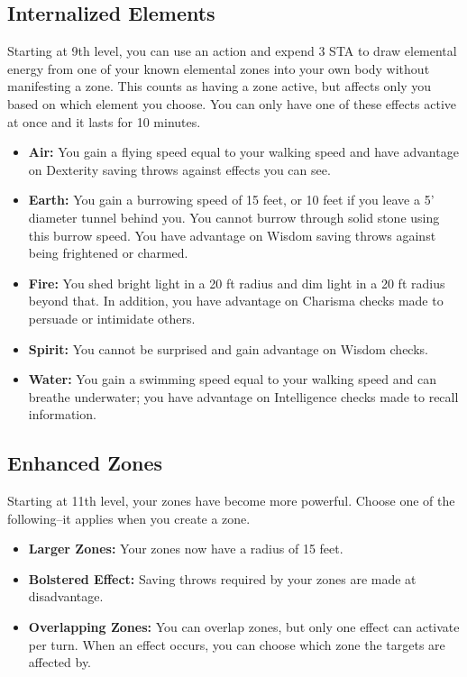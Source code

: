 \subsection{Internalized Elements}
Starting at 9th level, you can use an action and expend 3 STA to draw elemental energy from one of your known elemental zones into your own body without manifesting a zone. This counts as having a zone active, but affects only you based on which element you choose. You can only have one of these effects active at once and it lasts for 10 minutes.
\begin{itemize}
	\item \textbf{Air:} You gain a flying speed equal to your walking speed and have advantage on Dexterity saving throws against effects you can see.
	\item \textbf{Earth:} You gain a burrowing speed of 15 feet, or 10 feet if you leave a 5' diameter tunnel behind you. You cannot burrow through solid stone using this burrow speed. You have advantage on Wisdom saving throws against being frightened or charmed.
	\item \textbf{Fire:} You shed bright light in a 20 ft radius and dim light in a 20 ft radius beyond that. In addition, you have advantage on Charisma checks made to persuade or intimidate others.
	\item \textbf{Spirit:} You cannot be surprised and gain advantage on Wisdom checks.
	\item \textbf{Water:} You gain a swimming speed equal to your walking speed and can breathe underwater; you have advantage on Intelligence checks made to recall information.
\end{itemize}

\subsection{Enhanced Zones}
Starting at 11th level, your zones have become more powerful. Choose one of the following--it applies when you create a zone.
\begin{itemize}
	\item \textbf{Larger Zones:} Your zones now have a radius of 15 feet.
	\item \textbf{Bolstered Effect:} Saving throws required by your zones are made at disadvantage.
	\item \textbf{Overlapping Zones:} You can overlap zones, but only one effect can activate per turn. When an effect occurs, you can choose which zone the targets are affected by.
\end{itemize}

